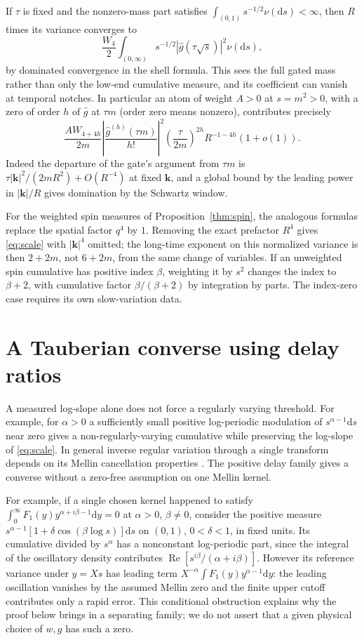 \documentclass[11pt]{article}
\theoremstyle{remark}
\newcommand{\dd}{\mathrm d}
\begin{document}
If \(\tau\) is fixed and the nonzero-mass part satisfies
\(\int_{(0,1)}s^{-1/2}\nu(\dd s)<\infty\), then \(R\)
times its variance converges to
\[
 \frac{W_4}{2}\int_{(0,\infty)}
       s^{-1/2}|\widehat g(\tau\sqrt s)|^2\nu(\dd s),
\]
by dominated convergence in the shell formula. This sees
the full gated mass rather than only the low-end cumulative
measure, and its coefficient can vanish at temporal notches.
In particular an atom of weight \(A>0\) at \(s=m^2>0\), with a
zero of order \(h\) of \(\widehat g\) at \(\tau m\) (order zero
means nonzero), contributes precisely
\[
 \frac{A W_{4+4h}}{2m}
  \left|\frac{\widehat g^{(h)}(\tau m)}{h!}\right|^2
  \left(\frac{\tau}{2m}\right)^{2h} R^{-1-4h}(1+o(1)).
\]
Indeed the departure of the gate's argument from \(\tau m\)
is \(\tau|\mathbf k|^2/(2mR^2)+O(R^{-4})\) at fixed
\(\mathbf k\), and a global bound by the leading power in
\(|\mathbf k|/R\) gives domination by the Schwartz window.

For the weighted spin measures of Proposition~\ref{thm:spin},
the analogous formulas replace the spatial factor \(q^4\)
by \(1\). Removing the exact prefactor \(R^4\) gives
\eqref{eq:scale} with \(|\mathbf k|^4\) omitted; the long-time
exponent on this normalized variance is then \(2+2m\),
not \(6+2m\), from the same change of variables. If an
unweighted spin cumulative has positive index \(\beta\),
weighting it by \(s^2\) changes the index to \(\beta+2\), with
cumulative factor \(\beta/(\beta+2)\) by integration by parts.
The index-zero case requires its own slow-variation data.

\section{A Tauberian converse using delay ratios}
\label{sec:converse}

A measured log-slope alone does not force a regularly varying
threshold. For example, for \(\alpha>0\) a sufficiently small
positive log-periodic modulation of \(s^{\alpha-1}\dd s\)
near zero gives a non-regularly-varying cumulative while
preserving the log-slope of \eqref{eq:scale}. In general
inverse regular variation through a single transform depends
on its Mellin cancellation properties \cite{JMRS}. The
positive delay family gives a converse without a zero-free
assumption on one Mellin kernel.

For example, if a single chosen kernel happened to satisfy
\(\int_0^\infty F_1(y)y^{\alpha+i\beta-1}\dd y=0\) at
\(\alpha>0\), \(\beta\ne0\), consider the positive measure
\(s^{\alpha-1}[1+\delta\cos(\beta\log s)]\dd s\) on \((0,1)\),
\(0<\delta<1\), in fixed units. Its cumulative divided by
\(s^\alpha\) has a nonconstant log-periodic part, since the
integral of the oscillatory density contributes
\(\operatorname{Re}[s^{i\beta}/(\alpha+i\beta)]\).
However its reference variance under \(y=Xs\) has leading
term \(X^{-\alpha}\int F_1(y)y^{\alpha-1}\dd y\): the leading
oscillation vanishes by the assumed Mellin zero and the
finite upper cutoff contributes only a rapid error. This
conditional obstruction explains why the proof below brings
in a separating family; we do not assert that a given
physical choice of \(w,g\) has such a zero.
\end{document}
